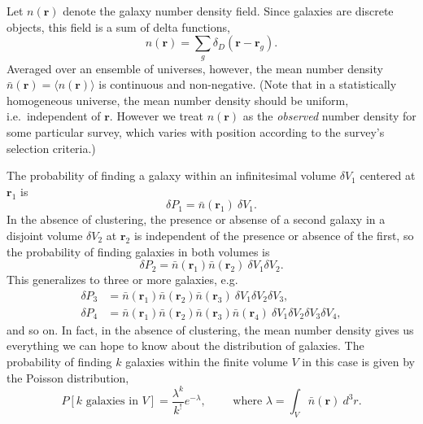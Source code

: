 \documentclass{article}
\newcommand{\nbar}{\bar{n}}
\renewcommand{\vec}[1]{\bm{#1}}
\renewcommand{\r}{\vec{r}}
\begin{document}
Let $n(\r)$ denote the galaxy number density field.  Since galaxies are
discrete objects, this field is a sum of delta functions,
\begin{equation}
    n(\r) = \sum_g \delta_D(\r-\r_g).
\end{equation}
Averaged over an ensemble of universes, however, the mean number density
$\nbar(\r) = \langle n(\r) \rangle$ is continuous and non-negative.  (Note that
in a statistically homogeneous universe, the mean number density should be
uniform, i.e.~independent of $\r$.  However we treat $n(\r)$ as the
\emph{observed} number density for some particular survey, which varies with
position according to the survey's selection criteria.)

The probability of finding a galaxy within an infinitesimal volume $\delta V_1$
centered at $\r_1$ is
\begin{equation}
    \delta P_1 = \nbar(\r_1)~ \delta V_1.
\end{equation}
In the absence of clustering, the presence or absense of a second galaxy in a
disjoint volume $\delta V_2$ at $\r_2$ is independent of the presence or
absence of the first, so the probability of finding galaxies in both volumes is
\begin{equation}
    \label{eq:p2nc}
    \delta P_2 = \nbar(\r_1) \nbar(\r_2)~ \delta V_1 \delta V_2.
\end{equation}
This generalizes to three or more galaxies, e.g.
\begin{align}
    \delta P_3 &= \nbar(\r_1) \nbar(\r_2) \nbar(\r_3)~ \delta V_1 \delta V_2 \delta V_3, \\
    \delta P_4 &= \nbar(\r_1) \nbar(\r_2) \nbar(\r_3) \nbar(\r_4)~ \delta V_1 \delta V_2 \delta V_3 \delta V_4,
\end{align}
and so on.  In fact, in the absence of clustering, the mean number density
gives us everything we can hope to know about the distribution of galaxies.
The probability of finding $k$ galaxies within the finite volume $V$ in this
case is given by the Poisson distribution,
\begin{equation}
    P[k \text{ galaxies in } V] = \frac{\lambda^k}{k^!} e^{-\lambda}, \qquad \text{ where } \lambda = \int_V \nbar(\r)~ d^3r.
\end{equation}
\end{document}
